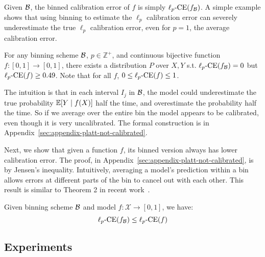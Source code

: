 Given $\mathcal{B}{}$, the binned calibration error of $f$ is simply $\ell_p\textup{-CE}(f_{\mathcal{B}{}})$.
A simple example shows that using binning to estimate the $\ell_p$ calibration error can severely underestimate the true $\ell_p$ calibration error, even for $p=1$, the average calibration error.

\newcommand{\continuousNotCalibratedText}{
For any binning scheme $\bins{}$, $p \in \mathbb{Z}^+$, and continuous bijective function $f : [0, 1] \to [0, 1]$, there exists a distribution $P$ over $X, Y$ s.t. $\lpce(f_{\bins{}}) = 0$ but $\lpce(f) \geq 0.49$.
Note that for all $f$, $0 \leq \lpce(f) \leq 1$.
}

\begin{example}
\label{ex:continuous-not-calibrated}
\continuousNotCalibratedText{}
\end{example}

\newtheorem*{continuousNotCalibrated}{Restatement of Example~\ref{ex:continuous-not-calibrated}}

The intuition is that in each interval $I_j$ in $\mathcal{B}{}$, the model could underestimate the true probability $\mathbb{E}[Y \mid f(X)]$ half the time, and overestimate the probability half the time. So if we average over the entire bin the model appears to be calibrated, even though it is very uncalibrated. The formal construction is in Appendix~\ref{sec:appendix-platt-not-calibrated}.

Next, we show that given a function $f$, its binned version always has lower calibration error. The proof, in Appendix~\ref{sec:appendix-platt-not-calibrated}, is by Jensen's inequality. Intuitively, averaging a model's prediction within a bin allows errors at different parts of the bin to cancel out with each other. This result is similar to Theorem 2 in recent work~\cite{vaicenavicius2019calibration}.

\newcommand{\binningLowerBoundText}{
Given binning scheme $\bins{}$ and model $f : \mathcal{X} \to [0, 1]$, we have:
\[  \lpce(f_{\bins{}}) \leq \lpce(f) \]
}

\begin{proposition}
\label{prop:bin_low_bound}
\binningLowerBoundText{}
\end{proposition}

\newtheorem*{binningLowerBound}{Restatement of Proposition~\ref{prop:bin_low_bound}}

\subsection{Experiments}


